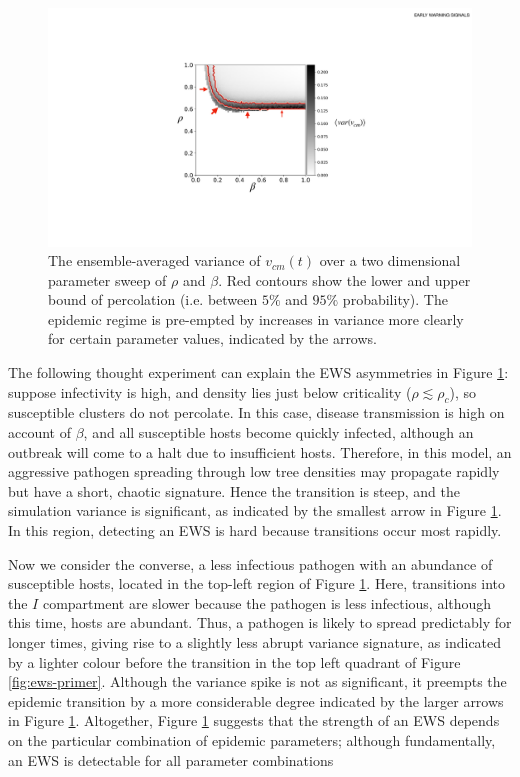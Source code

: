  \begin{figure}
    \centering
    \includegraphics[scale=0.45]{chapter3/figures/figure11.pdf}
    \caption{The ensemble-averaged variance of $v_{cm}(t)$ over a two dimensional parameter sweep of $\rho$ and $\beta$. Red contours show the lower and upper bound of percolation (i.e. between $5\%$ and $95\%$ probability). 
     The epidemic regime is pre-empted by increases in variance more clearly for certain parameter values, %
     indicated by the arrows.}
    \label{fig:ews-results} 
\end{figure}

The following thought experiment can explain the EWS asymmetries in Figure \ref{fig:ews-results}: %
suppose infectivity is high, and density lies just below criticality ($\rho\lesssim\rho_c$), 
so susceptible clusters do not percolate. 
In this case, disease transmission is high on account of $\beta$, 
and all susceptible hosts become quickly infected, 
although an outbreak will come to a halt due to insufficient hosts. Therefore, in this model, 
an aggressive pathogen spreading through low tree densities may propagate rapidly but have a short, 
chaotic signature. Hence the transition is steep,
and the simulation variance is significant, as indicated by the smallest arrow in Figure \ref{fig:ews-results}. 
In this region, detecting an EWS is hard because transitions occur most rapidly.

Now we consider the converse, a less infectious pathogen with an abundance of susceptible hosts, 
located in the top-left region of Figure \ref{fig:ews-results}.
Here, transitions into the $I$ compartment are slower because the pathogen is less infectious, 
although this time, hosts are abundant.
Thus, a pathogen is likely to spread predictably for longer times, 
giving rise to a slightly less abrupt variance signature, 
as indicated by a lighter colour before the transition in the top left quadrant of Figure \ref{fig:ews-primer}.
Although the variance spike is not as significant, 
it preempts the epidemic transition by a more considerable degree\textemdash
indicated by the larger arrows in Figure \ref{fig:ews-results}.
Altogether, Figure \ref{fig:ews-results} suggests that the strength of an EWS depends on the particular combination of epidemic parameters; 
although fundamentally, an EWS is detectable for all parameter combinations
\newpage

